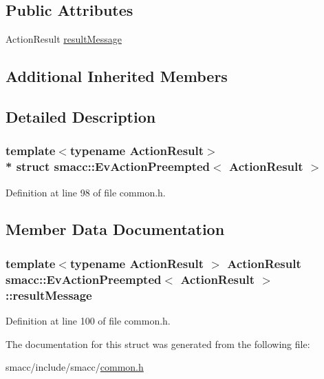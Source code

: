 \subsection*{Public Attributes}
\begin{DoxyCompactItemize}
\item 
Action\+Result \hyperlink{structsmacc_1_1EvActionPreempted_aa1313a40ab00f27b29cc1441b1441977}{result\+Message}
\end{DoxyCompactItemize}
\subsection*{Additional Inherited Members}


\subsection{Detailed Description}
\subsubsection*{template$<$typename Action\+Result$>$\\*
struct smacc\+::\+Ev\+Action\+Preempted$<$ Action\+Result $>$}



Definition at line 98 of file common.\+h.



\subsection{Member Data Documentation}
\subsubsection[{\texorpdfstring{result\+Message}{resultMessage}}]{\setlength{\rightskip}{0pt plus 5cm}template$<$typename Action\+Result $>$ Action\+Result {\bf smacc\+::\+Ev\+Action\+Preempted}$<$ Action\+Result $>$\+::result\+Message}\hypertarget{structsmacc_1_1EvActionPreempted_aa1313a40ab00f27b29cc1441b1441977}{}\label{structsmacc_1_1EvActionPreempted_aa1313a40ab00f27b29cc1441b1441977}


Definition at line 100 of file common.\+h.



The documentation for this struct was generated from the following file\+:\begin{DoxyCompactItemize}
\item 
smacc/include/smacc/\hyperlink{common_8h}{common.\+h}\end{DoxyCompactItemize}
